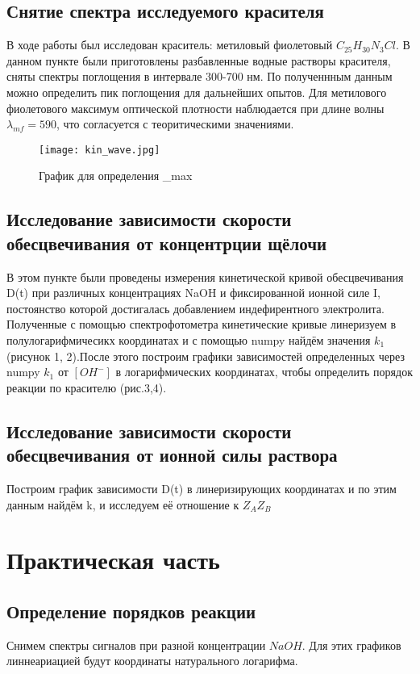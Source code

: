 \documentclass{article}
\begin{document}
\subsection{Снятие спектра исследуемого красителя}
В ходе работы был исследован краситель:
метиловый фиолетовый $C_{25}H_{30}N_3Cl$. В данном пункте были приготовлены разбавленные водные растворы красителя, сняты спектры поглощения в интервале 300-700 нм. По полученнным данным можно определить пик поглощения для дальнейших опытов. Для метилового фиолетового максимум оптической плотности наблюдается при длине волны $\lambda_ {mf} = 590$, что согласуется с теоритическими значениями.
\begin{figure}[H]
    \centering
    \texttt{[image: kin\_wave.jpg]}
    \caption{График для определения \lambda_{max}}
\end{figure}

\subsection{Исследование зависимости скорости обесцвечивания от концентрции щёлочи}
В этом пункте были проведены измерения кинетической кривой обесцвечивания D(t) при различных концентрациях NaOH и фиксированной ионной силе I, постоянство которой достигалась добавлением индефирентного электролита.
Полученные с помощью спектрофотометра кинетические кривые линеризуем в полулогарифмичесикх координатах и с помощью numpy найдём значения $k_1$(рисунок 1, 2).После этого построим графики зависимостей определенных через numpy $k_1$ от $[OH^-]$ в логарифмических координатах, чтобы определить порядок реакции по красителю (рис.3,4).

\subsection{Исследование зависимости скорости обесцвечивания от ионной силы раствора}
Построим график зависимости D(t) в линеризирующих координатах и по этим данным найдём k, и исследуем её отношение к $Z_AZ_B$


\section{Практическая часть}
\subsection{Определение порядков реакции}

Снимем спектры сигналов при разной концентрации $NaOH$. Для этих графиков линнеариацией будут координаты натурального логарифма. 
\end{document}
